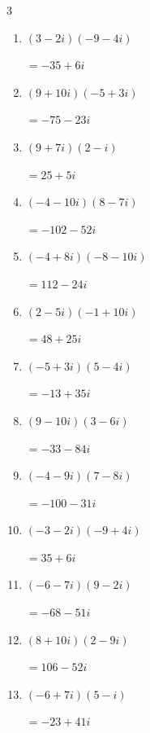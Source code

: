 \begin{multicols}{3}
\begin{enumerate}
        $\displaystyle =-41-42i$

  \item $\displaystyle (3-2i)(-9-4i)$

        $\displaystyle =-35+6i$

  \item $\displaystyle (9+10i)(-5+3i)$

        $\displaystyle =-75-23i$

  \item $\displaystyle (9+7i)(2-i)$

        $\displaystyle =25+5i$

  \item $\displaystyle (-4-10i)(8-7i)$

        $\displaystyle =-102-52i$

  \item $\displaystyle (-4+8i)(-8-10i)$

        $\displaystyle =112-24i$

  \item $\displaystyle (2-5i)(-1+10i)$

        $\displaystyle =48+25i$

  \item $\displaystyle (-5+3i)(5-4i)$

        $\displaystyle =-13+35i$

  \item $\displaystyle (9-10i)(3-6i)$

        $\displaystyle =-33-84i$

  \item $\displaystyle (-4-9i)(7-8i)$

        $\displaystyle =-100-31i$

  \item $\displaystyle (-3-2i)(-9+4i)$

        $\displaystyle =35+6i$

  \item $\displaystyle (-6-7i)(9-2i)$

        $\displaystyle =-68-51i$

  \item $\displaystyle (8+10i)(2-9i)$

        $\displaystyle =106-52i$

  \item $\displaystyle (-6+7i)(5-i)$

        $\displaystyle =-23+41i$

\columnbreak %


\end{enumerate}
\end{multicols}

